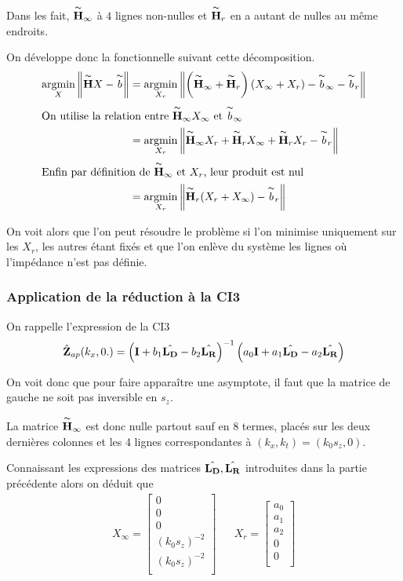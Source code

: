 Dans les fait, \(\overset{\thicksim}{\mathbf{H}}_\infty\) à \(4\) lignes non-nulles et \(\overset{\thicksim}{\mathbf{H}}_r\) en a autant de nulles au même endroits.


On développe donc la fonctionnelle suivant cette décomposition.
\begin{align*}
{\underset{X}{\operatorname{argmin}}}\left\rVert \overset{\thicksim}{\mathbf{H}} X - \overset{\thicksim}{b} \right \rVert &= {\underset{X_r}{\operatorname{argmin}}}\left\rVert \left(\overset{\thicksim}{\mathbf{H}}_\infty + \overset{\thicksim}{\mathbf{H}}_r\right)\left( X_\infty + X_r \right) - \overset{\thicksim}{b}_\infty - \overset{\thicksim}{b}_r \right \rVert
\\
\intertext{On utilise la relation entre \(\overset{\thicksim}{\mathbf{H}}_\infty X_\infty\) et \(\overset{\thicksim}{b}_\infty\)}
&=  {\underset{X_r}{\operatorname{argmin}}}\left\rVert \overset{\thicksim}{\mathbf{H}}_\infty X_r + \overset{\thicksim}{\mathbf{H}}_r X_\infty + \overset{\thicksim}{\mathbf{H}}_r X_r - \overset{\thicksim}{b}_r \right \rVert
\\
\intertext{Enfin par définition de \(\overset{\thicksim}{\mathbf{H}}_\infty\) et \(X_r\), leur produit est nul}
&= {\underset{X_r}{\operatorname{argmin}}} \left\rVert \overset{\thicksim}{\mathbf{H}}_r ( X_r + X_\infty)- \overset{\thicksim}{b}_r \right \rVert
\end{align*}

On voit alors que l'on peut résoudre le problème si l'on minimise uniquement sur les \(X_r\), les autres étant fixés et que l'on enlève du système les lignes où l'impédance n'est pas définie.

\subsubsection{Application de la réduction à la CI3}

On rappelle l'expression de la CI3
\begin{equation}
  \hat{\mathbf{Z}}_{ap}(k_x,0.) = \left(\mathbf{I} + b_1 \hat{\mathbf{L_D}} - b_2 \hat{\mathbf{L_R}} \right)^{-1}\left(a_0\mathbf{I} + a_1 \hat{\mathbf{L_D}} - a_2 \hat{\mathbf{L_R}} \right)
\end{equation}

On voit donc que pour faire apparaître une asymptote, il faut que la matrice de gauche ne soit pas inversible en \(s_z\).

La matrice \(\overset{\thicksim}{\mathbf{H}}_\infty\) est donc nulle partout sauf en 8 termes, placés sur les deux dernières colonnes et les 4 lignes correspondantes à \((k_x,k_t)=(k_0 s_z,0)\).

Connaissant les expressions des matrices \(\hat{\mathbf{L_D}},\hat{\mathbf{L_R}}\) introduites dans la partie précédente alors on déduit que
\begin{align}
  X_\infty = \begin{bmatrix}
    0\\
    0\\
    0\\
    (k_0 s_z)^{-2}\\
    (k_0 s_z)^{-2}\\
  \end{bmatrix}
  & &
  X_r = \begin{bmatrix}
  a_0\\
  a_1\\
  a_2\\
  0\\
  0\\
  \end{bmatrix}
\end{align}

